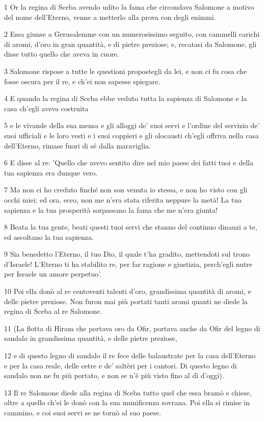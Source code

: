 \par 1 Or la regina di Sceba avendo udito la fama che circondava Salomone a motivo del nome dell'Eterno, venne a metterlo alla prova con degli enimmi.
\par 2 Essa giunse a Gerusalemme con un numerosissimo seguito, con cammelli carichi di aromi, d'oro in gran quantità, e di pietre preziose; e, recatasi da Salomone, gli disse tutto quello che aveva in cuore.
\par 3 Salomone rispose a tutte le questioni propostegli da lei, e non ci fu cosa che fosse oscura per il re, e ch'ei non sapesse spiegare.
\par 4 E quando la regina di Sceba ebbe veduto tutta la sapienza di Salomone e la casa ch'egli aveva costruita
\par 5 e le vivande della sua mensa e gli alloggi de' suoi servi e l'ordine del servizio de' suoi ufficiali e le loro vesti e i suoi coppieri e gli olocausti ch'egli offriva nella casa dell'Eterno, rimase fuori di sé dalla maraviglia.
\par 6 E disse al re: 'Quello che avevo sentito dire nel mio paese dei fatti tuoi e della tua sapienza era dunque vero.
\par 7 Ma non ci ho creduto finché non son venuta io stessa, e non ho visto con gli occhi miei; ed ora, ecco, non me n'era stata riferita neppure la metà! La tua sapienza e la tua prosperità sorpassano la fama che me n'era giunta!
\par 8 Beata la tua gente, beati questi tuoi servi che stanno del continuo dinanzi a te, ed ascoltano la tua sapienza.
\par 9 Sia benedetto l'Eterno, il tuo Dio, il quale t'ha gradito, mettendoti sul trono d'Israele! L'Eterno ti ha stabilito re, per far ragione e giustizia, perch'egli nutre per Israele un amore perpetuo'.
\par 10 Poi ella donò al re centoventi talenti d'oro, grandissima quantità di aromi, e delle pietre preziose. Non furon mai più portati tanti aromi quanti ne diede la regina di Sceba al re Salomone.
\par 11 (La flotta di Hiram che portava oro da Ofir, portava anche da Ofir del legno di sandalo in grandissima quantità, e delle pietre preziose,
\par 12 e di questo legno di sandalo il re fece delle balaustrate per la casa dell'Eterno e per la casa reale, delle cetre e de' saltèri per i cantori. Di questo legno di sandalo non ne fu più portato, e non se n'è più visto fino al dì d'oggi).
\par 13 Il re Salomone diede alla regina di Sceba tutto quel che essa bramò e chiese, oltre a quello ch'ei le donò con la sua munificenza sovrana. Poi ella si rimise in cammino, e coi suoi servi se ne tornò al suo paese.
